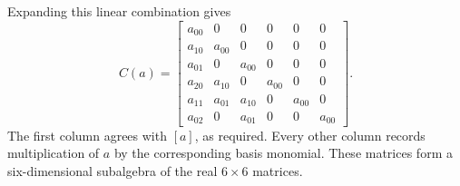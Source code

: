 Expanding this linear combination gives
\begin{equation}
\label{eq:multi-cr-explicit}
 C(a)=\begin{bmatrix}
 a_{00}&0&0&0&0&0\\
 a_{10}&a_{00}&0&0&0&0\\
 a_{01}&0&a_{00}&0&0&0\\
 a_{20}&a_{10}&0&a_{00}&0&0\\
 a_{11}&a_{01}&a_{10}&0&a_{00}&0\\
 a_{02}&0&a_{01}&0&0&a_{00}
 \end{bmatrix}.
\end{equation}
The first column agrees with $[a]$, as required. Every other column records
multiplication of $a$ by the corresponding basis monomial. These matrices
form a six-dimensional subalgebra of the real $6\times6$ matrices.

\newpage

